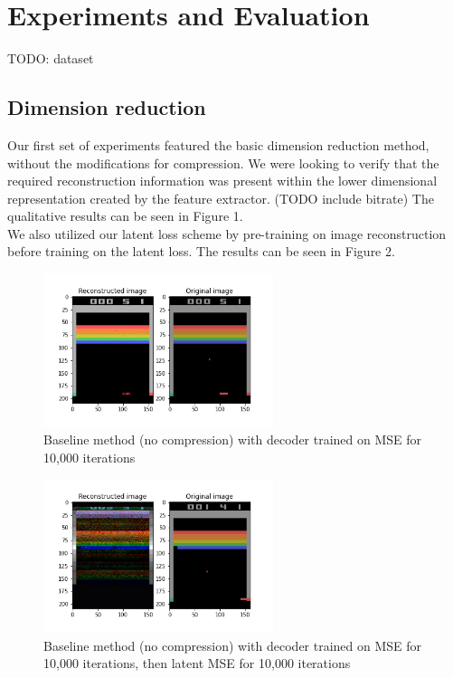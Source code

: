 \section{Experiments and Evaluation}
TODO: dataset
\subsection{Dimension reduction}
Our first set of experiments featured the basic dimension reduction method,
without the modifications for compression. We were looking to verify that the
required reconstruction information was present within the lower dimensional
representation created by the feature extractor. (TODO include bitrate) The
qualitative results can be seen in Figure 1. \\

We also utilized our latent loss scheme by pre-training on image reconstruction
before training on the latent loss. The results can be seen in Figure 2.
\begin{figure}[H]
    \centering
    \includegraphics[width=0.6\textwidth]{images/orig_reconstructed0.0.png}
    \caption{Baseline method (no compression) with decoder trained on MSE for 10,000 iterations}
    \label{fig:baseline_MSE}
\end{figure}
\begin{figure}[H]
    \centering
    \includegraphics[width=0.6\textwidth]{images/orig_reconstructed_rl3.0.png}
    \caption{Baseline method (no compression) with decoder trained on MSE for 10,000 iterations, then latent MSE for 10,000 iterations}
    \label{fig:baseline_MSE_latent}
\end{figure}

